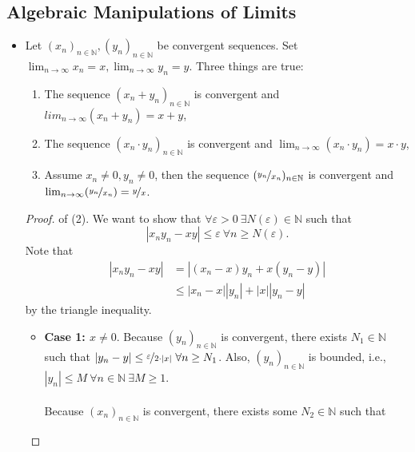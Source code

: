 \documentclass{article}
\newcommand{\N}{\mathbb{N}}
\newcommand{\seq}[2]{(#1_{#2})_{#2 \in \N}}
\newcommand{\?}{\stackrel{?}{=}}
\newcommand{\smallblacksquare}{\rule{0.5em}{0.5em}}
\theoremstyle{definition} %
\begin{document}
\subsection{Algebraic Manipulations of Limits}

\begin{itemize}
    \item[]
          \begin{lemma}
              Let $\seq{x}{n}, \seq{y}{n}$ be convergent sequences. Set $\lim_{n \to \infty} x_n = x, \lim_{n \to \infty} y_n = y$. Three things are true:
              \begin{enumerate}[label=(\arabic*)]
                  \item The sequence $(x_n + y_n)_{n \in \N}$ is convergent and $lim_{n \to \infty} (x_n + y_n) = x + y$,
                  \item The sequence $(x_n \cdot y_n)_{n \in \N}$ is convergent and $\lim_{n \to \infty} (x_n \cdot y_n) = x \cdot y$,
                  \item Assume $x_n \neq 0, y_n \neq 0$, then the sequence $(\nicefrac{y_n}{x_n})_{n \in \N}$ is convergent and $\lim_{n \to \infty} (\nicefrac{y_n}{x_n}) = \nicefrac{y}{x}$.
              \end{enumerate}
          \end{lemma}
          \begin{proof}
              of (2). We want to show that $\forall \varepsilon > 0 \ \exists N(\varepsilon) \in \N$ such that
              $$|x_ny_n - xy| \leq \varepsilon \ \forall n \geq N(\varepsilon).$$
              Note that
              \begin{align*}
                  |x_ny_n - xy| & = |(x_n - x)y_n + x(y_n - y)|      \\
                                & \leq |x_n - x||y_n| + |x||y_n - y|
              \end{align*}
              by the triangle inequality.
              \begin{itemize}[label=\smallblacksquare]
                  \item \textbf{Case 1: $x \neq 0$}. Because $\seq{y}{n}$ is convergent, there exists $N_1 \in \N$ such that $|y_n - y| \leq \nicefrac{\varepsilon}{2 \cdot |x|} \ \forall n \geq N_1$. Also, $\seq{y}{n}$ is bounded, i.e., $|y_n| \leq M \ \forall n \in \N \ \exists M \geq 1$. \\\\
                        Because $\seq{x}{n}$ is convergent, there exists some $N_2 \in \N$ such that

\end{itemize}
\end{proof}
\end{itemize}
\end{document}

